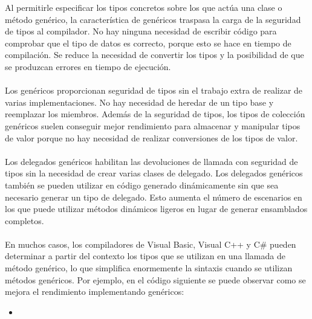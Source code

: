 \documentclass[10pt,a4paper]{article}
\newcommand{\perlscript}[2]{
	\begin{itemize}
	\item[]
	\end{itemize}
	}
\begin{document}
Al permitirle especificar los tipos concretos sobre los que act\'ua una clase o m\'etodo gen\'erico, la caracter\'istica de gen\'ericos traspasa la carga de la seguridad de tipos al compilador. No hay ninguna necesidad de escribir c\'odigo para comprobar que el tipo de datos es correcto, porque esto se hace en tiempo de compilaci\'on. Se reduce la necesidad de convertir los tipos y la posibilidad de que se produzcan errores en tiempo de ejecuci\'on.
\\\\
Los gen\'ericos proporcionan seguridad de tipos sin el trabajo extra de realizar de varias implementaciones. No hay necesidad de heredar de un tipo base y reemplazar los miembros. Adem\'as de la seguridad de tipos, los tipos de colecci\'on gen\'ericos suelen conseguir mejor rendimiento para almacenar y manipular tipos de valor porque no hay necesidad de realizar conversiones de los tipos de valor.
\\\\
Los delegados gen\'ericos habilitan las devoluciones de llamada con seguridad de tipos sin la necesidad de crear varias clases de delegado. Los delegados gen\'ericos tambi\'en se pueden utilizar en c\'odigo generado din\'amicamente sin que sea necesario generar un tipo de delegado. Esto aumenta el n\'umero de escenarios en los que puede utilizar m\'etodos din\'amicos ligeros en lugar de generar ensamblados completos.
\\\\
En muchos casos, los compiladores de Visual Basic, Visual C++ y C\# pueden determinar a partir del contexto los tipos que se utilizan en una llamada de m\'etodo gen\'erico, lo que simplifica enormemente la sintaxis cuando se utilizan m\'etodos gen\'ericos. Por ejemplo, en el c\'odigo siguiente se puede observar como se mejora el rendimiento implementando gen\'ericos:

        \perlscript{EjemploLatex}{}
        
    
\end{document}
